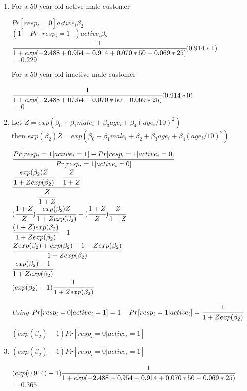 \documentclass{article}
\begin{document}
\begin{enumerate}[label=(\alph*)]

	\item{}
	For a 50 year old active male customer
	\begin{center}
	$Pr[resp_{i} = 0]active_{i} \beta_{2}$ \\ [4pt]
	$ (1 - Pr[resp_{i} =1])active_{i} \beta_{2}$ \\ [4pt]
	$ \cfrac{1}{1+exp(-2.488 + 0.954 + 0.914 + 0.070 * 50 -0.069 * 25)} (0.914 * 1) $ \\[4pt]
	$ = 0.229 $ \\ [4pt]
	\end{center}
	
	For a 50 year old inactive male customer \\
	\begin{center}
	$\cfrac{1}{1+exp(-2.488 + 0.954 + 0.070 * 50 -0.069 * 25)} (0.914 * 0) $ \\
	$= 0$ \\
	\end{center}
	
	\item
	Let $Z =  exp(\beta_{0} + \beta_{1} male_{i} + \beta_{3} age_{i} + \beta_{4}(age_{i}/10)^{2}) $\\ [6pt]
	then $exp(\beta_{2})Z = exp(\beta_{0} + \beta_{1} male_{i} + \beta_{2} + \beta_{3} age_{i} + \beta_{4}(age_{i}/10)^{2})$ \\ [6pt]
	
	\begin{center}
	$\cfrac{Pr[resp_{i}=1|active_{i}=1] - Pr[resp_{i}=1|active_{i}=0]}{Pr[resp_{i}=1|active_{i}=0]}	$ \\ [6pt]
	$\cfrac{\cfrac{exp(\beta_{2})Z}{1 + Zexp(\beta_{2})} - \cfrac{Z}{1+Z}}{\cfrac{Z}{1+Z}}$ \\	[6pt]
	$(\cfrac{1+Z}{Z})\cfrac{exp(\beta_{2})Z}{1 + Zexp(\beta_{2})} - (\cfrac{1+Z}{Z})\cfrac{Z}{1+Z}$ \\ [6pt]
	$ \cfrac{(1+Z)exp(\beta_{2})}{1 + Zexp(\beta_{2})} - 1$ \\ [6pt]
	$ \cfrac{Zexp(\beta_{2}) + exp(\beta_{2}) - 1 - Zexp(\beta_{2})}{1 + Zexp(\beta_{2})}$ \\ [6pt]
	$ \cfrac{exp(\beta_{2}) - 1}{1 + Zexp(\beta_{2})}$ \\ [6pt]
	$ (exp(\beta_{2}) - 1)\cfrac{1}{1 + Zexp(\beta_{2})}$ \\ [6pt]
	\end{center}
	\textit{Using $Pr[resp_{i}=0|active_{i}=1] = 1 - Pr[resp_{i}=1|active_{i}] = \cfrac{1}{1 + Zexp(\beta_{2})}$} \\ [6pt]
	\begin{center}
	$ (exp(\beta_{2}) - 1)Pr[resp_{i}=0|active_{i}=1] $ \\	[6pt]
	\end{center}

		
	
	\item
	$(exp(\beta_{2}) - 1) Pr[ resp_{i} =0 | active_{i} =1]$ \\[4pt]
	\begin{center}
	$(exp(0.914) -1) \cfrac{1}{1+exp(-2.488 + 0.954 + 0.914 + 0.070 * 50 -0.069 * 25)}$ \\[4pt]
	$ = 0.365$ \\ [8pt]
	\end{center}
\end{enumerate}
\end{document}
